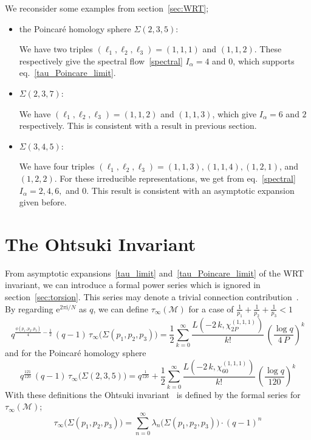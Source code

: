 \documentclass[12pt,reqno]{amsart}
\numberwithin{equation}{section}
\begin{document}
We  reconsider some  examples from  section~\ref{sec:WRT};
\begin{itemize}
\item the Poincar{\'e} homology sphere $\Sigma(2,3,5)$:

  We have two triples
  $(\ell_1, \ell_2, \ell_3)
  =(1,1,1)$ and $ (1,1,2)$.
  These respectively
  give the spectral flow~\eqref{spectral}
  $  I_\alpha = 4$ and
  $ 0$,
  which supports eq.~\eqref{tau_Poincare_limit}.

\item $\Sigma(2,3,7)$:

  We have
  $(\ell_1, \ell_2, \ell_3)
  =
  (1,1,2)$
  and $(1,1,3)$,
  which give
  $  I_\alpha = 6$ and $2$ respectively.
  This is consistent with a result in previous section.

\item $\Sigma(3,4,5)$:

  We have four triples
  $(\ell_1, \ell_2, \ell_3)
  =(1,1,3),
  (1,1,4),
  (1,2,1)$, and
  $(1,2,2)$.
  For these irreducible representations, we get
  from eq.~\eqref{spectral} 
  $  I_\alpha = 2, 4, 6,$ and
  $ 0$.
  This result is consistent with an asymptotic expansion given before.
\end{itemize}
\section{The Ohtsuki Invariant}
\label{sec:Ohtsuki}

{}From  asymptotic expansions~\eqref{tau_limit}
and~\eqref{tau_Poincare_limit} of the WRT invariant,
we can introduce a formal power
series which is  ignored in section~\ref{sec:torsion}.
This series may denote a trivial connection contribution~\cite{LRozan96f,LRozan97a,LawreRozan99a}.
By regarding $\mathrm{e}^{2 \pi \mathrm{i}/N}$ as $q$,
we can define $\tau_\infty(\mathcal{M})$
for a case of
$\frac{1}{p_1} + \frac{1}{p_2} +\frac{1}{p_3} <1$ 
\begin{equation}
  \label{infinity_general}
  q^{
    \frac{\phi(p_1,p_2,p_3)}{4} - \frac{1}{2} 
  } \,
  \left(
    q
    - 1
  \right)
  \,
  \tau_\infty\bigl( \Sigma(p_1, p_2, p_3) \bigr)
  =
  \frac{1}{2} \sum_{k=0}^\infty
  \frac{L(-2 \, k , \chi_{2 P}^{(1,1,1)})}{k!}
  \,
  \left(
    \frac{\log q}{
      4 \, P 
    }
  \right)^k
\end{equation}
and for the Poincar{\'e} homology sphere
\begin{equation}
  \label{infinity_Poincare}
  q^{
    \frac{121}{120}
  } \,
  \left(
    q    - 1
  \right)
  \,    \tau_\infty \bigl( \Sigma(2,3,5) \bigr)
  =
  q^{\frac{1}{120} }
  +
  \frac{1}{2}
  \sum_{k=0}^\infty
  \frac{L(-2 \, k , \chi_{60}^{(1,1,1)})}{k!} \,
  \left(
    \frac{\log q}{120}
  \right)^k  
\end{equation}
With these definitions
the Ohtsuki invariant~\cite{TOhtsu96a} is
defined 
by
the formal series for
$\tau_\infty(\mathcal{M})$;
\begin{equation}
  \tau_\infty\bigl( \Sigma(p_1, p_2, p_3) \bigr)
  =
  \sum_{n=0}^\infty
  \lambda_n \bigl( \Sigma(p_1, p_2, p_3) \bigr)
  \cdot (q-1)^{n}
\end{equation}
\end{document}
